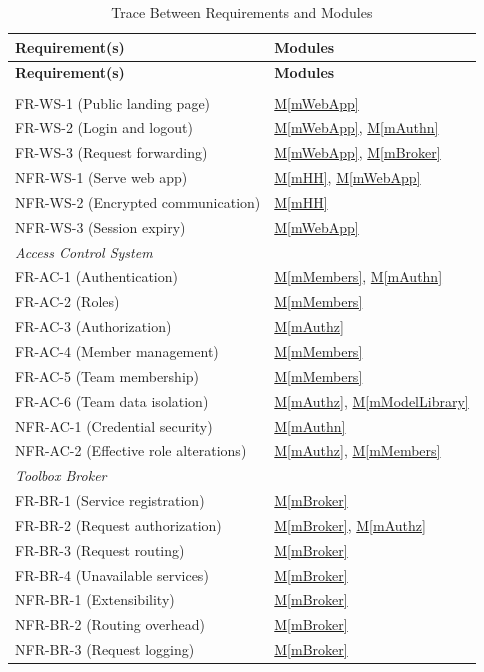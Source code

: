 \documentclass[12pt, titlepage]{article}
\newcommand{\mref}[1]{\hyperref[#1:dec]{M\ref*{#1}}}
\begin{document}
\clearpage
\begin{longtable}{p{} p{}}
\caption{Trace Between Requirements and Modules} \label{TblRT}\\
\toprule
\textbf{Requirement(s)} & \textbf{Modules}\\
\midrule
\endfirsthead
\toprule
\textbf{Requirement(s)} & \textbf{Modules}\\
\midrule
\endhead
\bottomrule
\endfoot
\multicolumn{2}{l}{\emph{Web Server}}\\
FR-WS-1 (Public landing page) & \mref{mWebApp}\\
FR-WS-2 (Login and logout) & \mref{mWebApp}, \mref{mAuthn}\\
FR-WS-3 (Request forwarding) & \mref{mWebApp}, \mref{mBroker}\\
NFR-WS-1 (Serve web app) & \mref{mHH}, \mref{mWebApp}\\
NFR-WS-2 (Encrypted communication) & \mref{mHH}\\
NFR-WS-3 (Session expiry) & \mref{mWebApp}\\
\midrule
\multicolumn{2}{l}{\emph{Access Control System}}\\
FR-AC-1 (Authentication) & \mref{mMembers}, \mref{mAuthn}\\
FR-AC-2 (Roles) & \mref{mMembers}\\
FR-AC-3 (Authorization) & \mref{mAuthz}\\
FR-AC-4 (Member management) & \mref{mMembers}\\
FR-AC-5 (Team membership) & \mref{mMembers}\\
FR-AC-6 (Team data isolation) & \mref{mAuthz}, \mref{mModelLibrary}\\
NFR-AC-1 (Credential security) & \mref{mAuthn}\\
NFR-AC-2 (Effective role alterations) & \mref{mAuthz}, \mref{mMembers}\\
\midrule
\multicolumn{2}{l}{\emph{Toolbox Broker}}\\
FR-BR-1 (Service registration) & \mref{mBroker}\\
FR-BR-2 (Request authorization) & \mref{mBroker}, \mref{mAuthz}\\
FR-BR-3 (Request routing) & \mref{mBroker}\\
FR-BR-4 (Unavailable services) & \mref{mBroker}\\
NFR-BR-1 (Extensibility) & \mref{mBroker}\\
NFR-BR-2 (Routing overhead) & \mref{mBroker}\\
NFR-BR-3 (Request logging) & \mref{mBroker}\\

\end{longtable}
\end{document}
